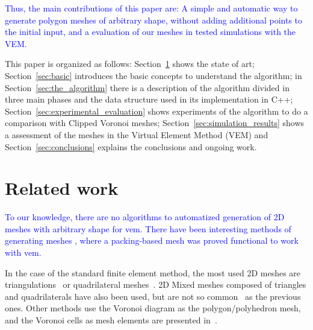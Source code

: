 %
\textcolor{blue}{Thus, the main contributions of this paper are: A simple and automatic way to generate polygon meshes of arbitrary shape, without adding additional points to the initial input, and a evaluation of our meshes in tested simulations with the VEM.}


This paper is organized as follows: Section~\ref{sec:relatedwork} shows the state of art;  Section~\ref{sec:basic} introduces the basic concepts to understand the algorithm; in Section~\ref{sec:the_algorithm} there is a description of the algorithm divided in three main phases and the data structure used in its implementation in C++; Section~\ref{sec:experimental_evaluation} shows experiments of the algorithm to do a comparison with Clipped Voronoi meshes; Section~\ref{sec:simulation_results} shows a assessment of the meshes in the Virtual Element Method (VEM) and Section~\ref{sec:conclusions} explains the conclusions and ongoing work.


\section{Related work}
\label{sec:relatedwork}


\textcolor{blue}{To our knowledge, there are no algorithms to automatized generation of 2D meshes with arbitrary shape for {\sc vem}. There have been interesting methods of generating meshes \cite{PackingJoaquin}, where a packing-based mesh was proved functional to work with {\sc vem}.} %

In the case of the standard finite element method, the most used 2D meshes are triangulations~\cite{chew1,Shewchuk96,Detri2} or quadrilateral meshes~\cite{Canann98,Lee20031055,Owen98advancingfront}. 2D Mixed meshes composed of triangles and quadrilaterals have also been used, but are not so common~\cite{gildaDiss} as the previous ones. Other methods use the Voronoi diagram as the polygon/polyhedron mesh, and the Voronoi cells as mesh elements are presented in~\cite{YanWLL10,EbeidaM11,SiegerAB10}.
 
